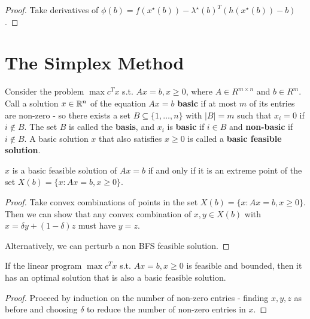 \begin{proof}
  Take derivatives of $\phi(b) = f(x^{\star}(b)) -
  \lambda^{\star}(b)^{T}(h(x^{\star}(b)) - b)$.
\end{proof}

\section{The Simplex Method}
\label{sec:simplex-method}

\begin{defn}
  \label{sec:simplex-method-2}
  Consider the problem $\max c^{T} x$ s.t. $Ax = b, x \geq 0$, where
  $A \in R^{m \times n}$ and $b \in R^{m}$.  Call a solution $x \in
  \mathbb{R}^{n}$ of the equation $Ax = b$ \textbf{basic} if at most $m$ of
  its entries are non-zero - so there exists a set $B \subseteq \{ 1,
  \dots, n \}$ with $|B| = m$ such that $x_{i} = 0$ if $i \notin B$.
  The set $B$ is called the \textbf{basis}, and $x_{i}$ is
  \textbf{basic} if $i \in B$ and \textbf{non-basic} if $i \notin B$.
  A basic solution $x$ that also satisfies $x \geq 0$ is called a
  \textbf{basic feasible solution}.
\end{defn}

\begin{thm}
  \label{sec:simplex-method-3}
  $x$ is a basic feasible solution of $Ax = b$ if and only if it is an
  extreme point of the set $X(b) = \{ x : Ax = b, x \geq 0 \} $.
\end{thm}

\begin{proof}
  Take convex combinations of points in the set $X(b) = \{ x: Ax = b,
  x \geq 0 \} $.  Then we can show that any convex combination of $x,
  y \in X(b)$ with $x = \delta y + (1 - \delta) z$ must have $y = z$.

  Alternatively, we can perturb a non BFS feasible solution.
\end{proof}

\begin{thm}
  \label{sec:simplex-method-4}
  If the linear program $\max c^{T} x$ s.t. $Ax = b, x \geq 0$ is
  feasible and bounded, then it has an optimal solution that is also a
  basic feasible solution.
\end{thm}

\begin{proof}
  Proceed by induction on the number of non-zero entries - finding $x,
  y, z$ as before and choosing $\delta$ to reduce the number of
  non-zero entries in $x$.
\end{proof}

